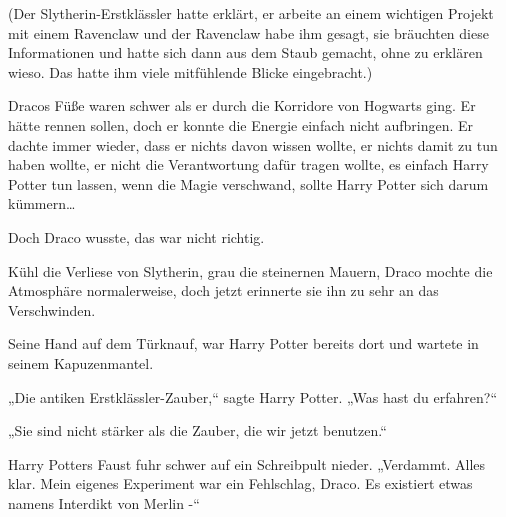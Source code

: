 (Der Slytherin-Erstklässler hatte erklärt, er arbeite an einem wichtigen Projekt mit einem Ravenclaw und der Ravenclaw habe ihm gesagt, sie bräuchten diese Informationen und hatte sich dann aus dem Staub gemacht, ohne zu erklären wieso. Das hatte ihm viele mitfühlende Blicke eingebracht.)

Dracos Füße waren schwer als er durch die Korridore von Hogwarts ging. Er hätte rennen sollen, doch er konnte die Energie einfach nicht aufbringen. Er dachte immer wieder, dass er nichts davon wissen wollte, er nichts damit zu tun haben wollte, er nicht die Verantwortung dafür tragen wollte, es einfach Harry Potter tun lassen, wenn die Magie verschwand, sollte Harry Potter sich darum kümmern…

Doch Draco wusste, das war nicht richtig.

Kühl die Verliese von Slytherin, grau die steinernen Mauern, Draco mochte die Atmosphäre normalerweise, doch jetzt erinnerte sie ihn zu sehr an das Verschwinden.

Seine Hand auf dem Türknauf, war Harry Potter bereits dort und wartete in seinem Kapuzenmantel.

„Die antiken Erstklässler-Zauber,“ sagte Harry Potter. „Was hast du erfahren?“

„Sie sind nicht stärker als die Zauber, die wir jetzt benutzen.“

Harry Potters Faust fuhr schwer auf ein Schreibpult nieder. „Verdammt. Alles klar. Mein eigenes Experiment war ein Fehlschlag, Draco. Es existiert etwas namens Interdikt von Merlin -“

